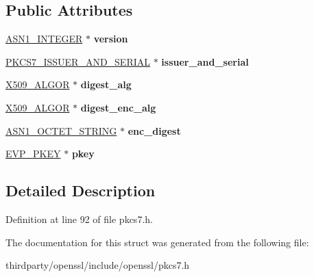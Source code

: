 \subsection*{Public Attributes}
\begin{DoxyCompactItemize}
\item 
\mbox{\label{structpkcs7__signer__info__st_ab6bd5b6bebe8adab9a294916c929bdc0}} 
\hyperlink{structasn1__string__st}{A\+S\+N1\+\_\+\+I\+N\+T\+E\+G\+ER} $\ast$ {\bfseries version}
\item 
\mbox{\label{structpkcs7__signer__info__st_aa50f5aaf37775fa181c551407b620d6c}} 
\hyperlink{structpkcs7__issuer__and__serial__st}{P\+K\+C\+S7\+\_\+\+I\+S\+S\+U\+E\+R\+\_\+\+A\+N\+D\+\_\+\+S\+E\+R\+I\+AL} $\ast$ {\bfseries issuer\+\_\+and\+\_\+serial}
\item 
\mbox{\label{structpkcs7__signer__info__st_a238fa797ab7db21717ae5b4d68a925ef}} 
\hyperlink{struct_x509__algor__st}{X509\+\_\+\+A\+L\+G\+OR} $\ast$ {\bfseries digest\+\_\+alg}
\item 
\mbox{\label{structpkcs7__signer__info__st_afe09a7f44afddb51e073c912cb5b7c7c}} 
\hyperlink{struct_x509__algor__st}{X509\+\_\+\+A\+L\+G\+OR} $\ast$ {\bfseries digest\+\_\+enc\+\_\+alg}
\item 
\mbox{\label{structpkcs7__signer__info__st_a75a871ba0bdc83cbd05822e844badf40}} 
\hyperlink{structasn1__string__st}{A\+S\+N1\+\_\+\+O\+C\+T\+E\+T\+\_\+\+S\+T\+R\+I\+NG} $\ast$ {\bfseries enc\+\_\+digest}
\item 
\mbox{\label{structpkcs7__signer__info__st_acac9c5af6fa0f01bb42fe39c8f2f646a}} 
\hyperlink{structevp__pkey__st}{E\+V\+P\+\_\+\+P\+K\+EY} $\ast$ {\bfseries pkey}
\end{DoxyCompactItemize}


\subsection{Detailed Description}


Definition at line 92 of file pkcs7.\+h.



The documentation for this struct was generated from the following file\+:\begin{DoxyCompactItemize}
\item 
thirdparty/openssl/include/openssl/pkcs7.\+h\end{DoxyCompactItemize}
